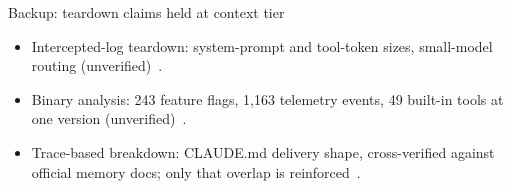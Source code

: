 \documentclass[aspectratio=169,11pt]{beamer}
\begin{document}
\begin{frame}{Backup: teardown claims held at context tier}
  \begin{itemize}
    \item Intercepted-log teardown: system-prompt and tool-token sizes,
      small-model routing (unverified)~\citep{minusXTeardown}.
    \item Binary analysis: 243 feature flags, 1{,}163 telemetry events,
      49 built-in tools at one version (unverified)~\citep{tenguDecoded}.
    \item Trace-based breakdown: CLAUDE.md delivery shape, cross-verified
      against official memory docs; only that overlap is reinforced~\citep{agiflowInternals,claudeCodeMemoryDocs}.
  \end{itemize}
\end{frame}
\end{document}
